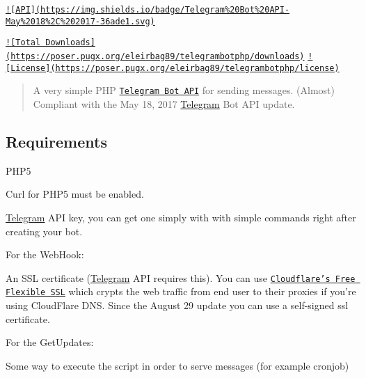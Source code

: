 \href{https://core.telegram.org/bots/api}{\tt !\mbox{[}A\-P\-I\mbox{]}(https\-://img.\-shields.\-io/badge/\-Telegram\%20\-Bot\%20\-A\-P\-I-\/\-May\%2018\%2\-C\%202017-\/36ade1.\-svg)}  

\href{https://packagist.org/packages/eleirbag89/telegrambotphp}{\tt !\mbox{[}Total Downloads\mbox{]}(https\-://poser.\-pugx.\-org/eleirbag89/telegrambotphp/downloads)} \href{https://packagist.org/packages/eleirbag89/telegrambotphp}{\tt !\mbox{[}License\mbox{]}(https\-://poser.\-pugx.\-org/eleirbag89/telegrambotphp/license)}

\begin{quotation}
A very simple P\-H\-P \href{https://core.telegram.org/bots}{\tt Telegram Bot A\-P\-I} for sending messages. (Almost) Compliant with the May 18, 2017 \hyperlink{class_telegram}{Telegram} Bot A\-P\-I update.

\end{quotation}


\subsection*{Requirements }


\begin{DoxyItemize}
\item P\-H\-P5
\item Curl for P\-H\-P5 must be enabled.
\item \hyperlink{class_telegram}{Telegram} A\-P\-I key, you can get one simply with \href{https://core.telegram.org/bots#botfather}{\tt } with simple commands right after creating your bot.
\end{DoxyItemize}

For the Web\-Hook\-:
\begin{DoxyItemize}
\item An S\-S\-L certificate (\hyperlink{class_telegram}{Telegram} A\-P\-I requires this). You can use \href{https://www.cloudflare.com/ssl}{\tt Cloudflare's Free Flexible S\-S\-L} which crypts the web traffic from end user to their proxies if you're using Cloud\-Flare D\-N\-S. Since the August 29 update you can use a self-\/signed ssl certificate.
\end{DoxyItemize}

For the Get\-Updates\-:
\begin{DoxyItemize}
\item Some way to execute the script in order to serve messages (for example cronjob)
\end{DoxyItemize}

